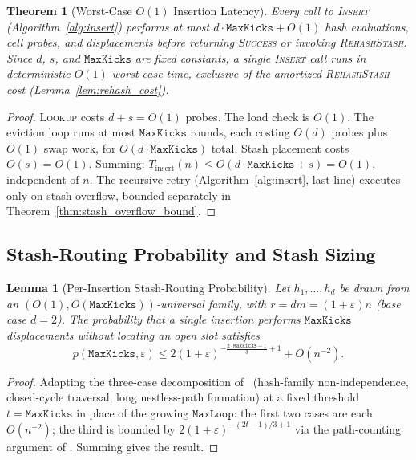 \documentclass[conference]{IEEEtran}
\let\oldtextsc\textsc
\renewcommand{\textsc}[1]{\textup{\oldtextsc{#1}}}
\newtheorem{theorem}{Theorem}
\newtheorem{lemma}{Lemma}
\begin{document}
	\begin{theorem}[Worst-Case $O(1)$ Insertion Latency]
		\label{thm:worst_case_latency}
		Every call to \textsc{Insert} (Algorithm~\ref{alg:insert}) performs
		at most $d\cdot\mathtt{MaxKicks}+O(1)$ hash evaluations, cell probes,
		and displacements before returning \textsc{Success} or invoking
		\textsc{RehashStash}. Since $d$, $s$, and $\mathtt{MaxKicks}$ are
		fixed constants, a single \textsc{Insert} call runs in deterministic
		$O(1)$ worst-case time, exclusive of the amortized
		\textsc{RehashStash} cost (Lemma~\ref{lem:rehash_cost}).
	\end{theorem}
	\begin{proof}
		\textsc{Lookup} costs $d+s=O(1)$ probes. The load check is $O(1)$.
		The eviction loop runs at most $\mathtt{MaxKicks}$ rounds, each
		costing $O(d)$ probes plus $O(1)$ swap work, for
		$O(d\cdot\mathtt{MaxKicks})$ total. Stash placement costs $O(s)=O(1)$.
		Summing: $T_{\text{insert}}(n) \le O(d\cdot\mathtt{MaxKicks}+s)=O(1)$,
		independent of $n$. The recursive retry (Algorithm~\ref{alg:insert},
		last line) executes only on stash overflow, bounded separately in
		Theorem~\ref{thm:stash_overflow_bound}.
	\end{proof}
	
	\subsection{Stash-Routing Probability and Stash Sizing}
	
	\begin{lemma}[Per-Insertion Stash-Routing Probability]
		\label{lem:stash_routing_prob}
		Let $h_1,\dots,h_d$ be drawn from an $(O(1),O(\mathtt{MaxKicks}))$-universal
		family, with $r=dm=(1+\varepsilon)n$ (base case $d=2$). The
		probability that a single insertion performs $\mathtt{MaxKicks}$
		displacements without locating an open slot satisfies
		\begin{equation}
			p(\mathtt{MaxKicks},\varepsilon) \le 2(1+\varepsilon)^{-\frac{2\cdot\mathtt{MaxKicks}-1}{3}+1} + O(n^{-2}).
		\end{equation}
	\end{lemma}
	\begin{proof}
		Adapting the three-case decomposition of~\cite{pagh2004cuckoo}
		(hash-family non-independence, closed-cycle traversal, long
		nestless-path formation) at a fixed threshold $t=\mathtt{MaxKicks}$
		in place of the growing $\mathtt{MaxLoop}$: the first two cases are
		each $O(n^{-2})$; the third is bounded by
		$2(1+\varepsilon)^{-(2t-1)/3+1}$ via the path-counting argument of
		\cite{pagh2004cuckoo}. Summing gives the result.
	\end{proof}
	
\end{document}
